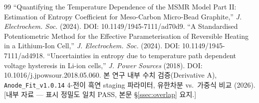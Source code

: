 \documentclass[11pt,a4paper]{article}
\begin{document}
\begin{thebibliography}{99}
 ``Quantifying the Temperature Dependence of the MSMR Model Part II: Estimation of Entropy Coefficient for Meso-Carbon Micro-Bead Graphite,'' \emph{J. Electrochem. Soc.} (2024). DOI: 10.1149/1945-7111/ad70d9.
 ``A Standardised Potentiometric Method for the Effective Parameterisation of Reversible Heating in a Lithium-Ion Cell,'' \emph{J. Electrochem. Soc.} (2024). DOI: 10.1149/1945-7111/ad4918.
 ``Uncertainties in entropy due to temperature path dependent voltage hysteresis in Li-ion cells,'' \emph{J. Power Sources} (2018). DOI: 10.1016/j.jpowsour.2018.05.060.
 본 연구 내부 수치 검증(Derivative A), \texttt{Anode\_Fit\_v1.0.14} 4-전이 흑연 staging 파라미터, 유한차분 vs.\ 가중식 비교 (2026). [내부 자료 — 표시 정밀도 일치 PASS, 본문 \S\ref{ssec:overlap} 요지.]
\end{thebibliography}
\end{document}
